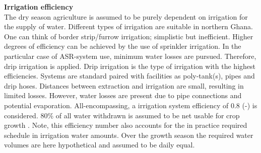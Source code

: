 \textbf{Irrigation efficiency} \\
The dry season agriculture is assumed to be purely dependent on irrigation for the supply of water. Different types of irrigation are suitable in northern Ghana. One can think of border strip/furrow irrigation; simplistic but inefficient. Higher degrees of efficiency can be achieved by the use of sprinkler irrigation. In the particular case of ASR-system use, minimum water losses are pursued. Therefore, drip irrigation is applied. Drip irrigation is the type of irrigation with the highest efficiencies. Systems are standard paired with facilities as poly-tank(s), pipes and drip hoses. Distances between extraction and irrigation are small, resulting in limited losses. However, water losses are present due to pipe connections and potential evaporation. All-encompassing, a irrigation system efficiency of 0.8 (-) is considered. 80\% of all water withdrawn is assumed to be net usable for crop growth \citep{VandeGiesen2013}. Note, this efficiency number also accounts for the in practice required schedule in irrigation water amounts. Over the growth season the required water volumes are here  hypothetical and assumed to be daily equal. \\
%
%
%
%

